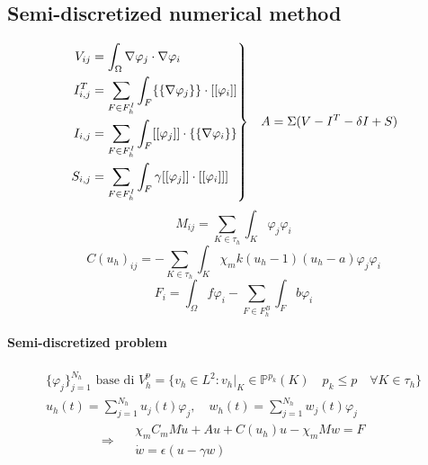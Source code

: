 \documentclass[a4paper]{article}
\newenvironment{rcases}
{\left.\begin{aligned}}
	{\end{aligned}\right\rbrace}
\begin{document}
\vspace{5mm}

\subsection{Semi-discretized numerical method}

	\vspace{5mm}
	 \begin{equation}
	 \begin{rcases}
	 V_{ij} &= \int_{\Omega}\nabla\varphi_j \cdot \nabla \varphi_i 
	 \\ I_{i,j}^T &= \sum_{F \in F_h^I} \int_{F} \{\{\nabla\varphi_j\}\} \cdot [[\varphi_i]] 
	\\ I_{i,j} &= \sum_{F \in F_h^I} \int_{F} [[\varphi_j]] \cdot \{\{\nabla \varphi_i\}\}
	 \\S_{i,j} &= \sum_{F \in F_h^I} \int_{F} \gamma [[\varphi_j]] \cdot [[\varphi_i]]]
	 \end{rcases}
	 \quad A = \Sigma(V -I^T - \delta I + S)
	\end{equation}
	\begin{equation}
	M_{ij} = \sum_{K \in \tau_h}\int_K
	\varphi_j\varphi_i
	\end{equation}
	\begin{equation}
	C(u_h)_{ij} = - \sum_{K \in \tau_h} \int_K \chi_m k(u_h-1)(u_h-a)\varphi_j\varphi_i
	\end{equation}
	\begin{equation}
	F_i = \int_{\Omega} f\varphi_i - \sum_{F \in F_h^B} \int_F b\varphi_i
	\end{equation}
	
	\vspace{3mm}
\paragraph{Semi-discretized problem} 

\begin{equation*}
\begin{gathered}
\{\varphi_j\}_{j=1}^{N_h} \text{ base di } V_h^p = \{v_h \in L^2 : v_h|_K \in \mathbb{P}^{p_k}(K) \quad p_k \leq p \quad \forall K \in \tau_h \}
\\
u_h(t) = \sum_{j=1}^{N_h} u_j(t)\varphi_j, \quad w_h(t) = \sum_{j=1}^{N_h}w_j(t)\varphi_j
\end{gathered}
\end{equation*}
\vspace{3mm}
\begin{equation}
\Rightarrow \quad  \begin{gathered}\boxed{\chi_mC_m M \dot{u} +  A u + C(u_h) u -\chi_mMw=F}
	\\
	\boxed{\dot{w} = \epsilon(u-\gamma w)}
	\end{gathered}
\end{equation}
\vspace{5mm}
\end{document}
